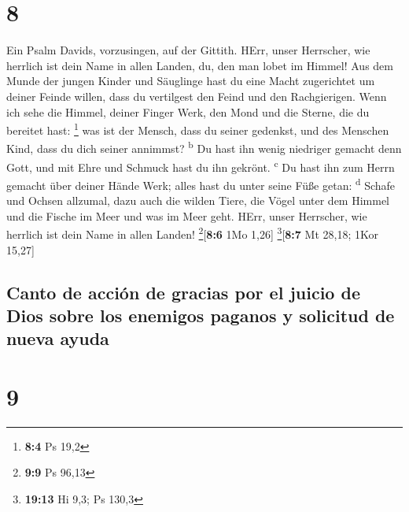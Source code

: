 \hypertarget{section-7}{%
\section{8}\label{section-7}}

 Ein Psalm Davids, vorzusingen, auf der Gittith.
 HErr, unser Herrscher, wie herrlich ist dein Name in
allen Landen, du, den man lobet im Himmel!  Aus dem Munde
der jungen Kinder und Säuglinge hast du eine Macht zugerichtet um deiner
Feinde willen, dass du vertilgest den Feind und den Rachgierigen.
 Wenn ich sehe die Himmel, deiner Finger Werk, den Mond
und die Sterne, die du bereitet hast: \footnote{\textbf{8:4} Ps 19,2}
 was ist der Mensch, dass du seiner gedenkst, und des
Menschen Kind, dass du dich seiner annimmst? \textsuperscript{b}
 Du hast ihn wenig niedriger gemacht denn Gott, und mit
Ehre und Schmuck hast du ihn gekrönt. \textsuperscript{c} 
Du hast ihn zum Herrn gemacht über deiner Hände Werk; alles hast du
unter seine Füße getan: \textsuperscript{d}  Schafe und
Ochsen allzumal, dazu auch die wilden Tiere,  die Vögel
unter dem Himmel und die Fische im Meer und was im Meer geht.
 HErr, unser Herrscher, wie herrlich ist dein Name in
allen Landen! \footnote{\textbf{9:9} Ps 96,13}{[}\textbf{8:6} 1Mo
1,26{]} \footnote{\textbf{19:13} Hi 9,3; Ps 130,3}{[}\textbf{8:7} Mt
28,18; 1Kor 15,27{]}

\hypertarget{canto-de-acciuxf3n-de-gracias-por-el-juicio-de-dios-sobre-los-enemigos-paganos-y-solicitud-de-nueva-ayuda}{%
\subsection{Canto de acción de gracias por el juicio de Dios sobre los
enemigos paganos y solicitud de nueva
ayuda}\label{canto-de-acciuxf3n-de-gracias-por-el-juicio-de-dios-sobre-los-enemigos-paganos-y-solicitud-de-nueva-ayuda}}

\hypertarget{section-8}{%
\section{9}\label{section-8}}

